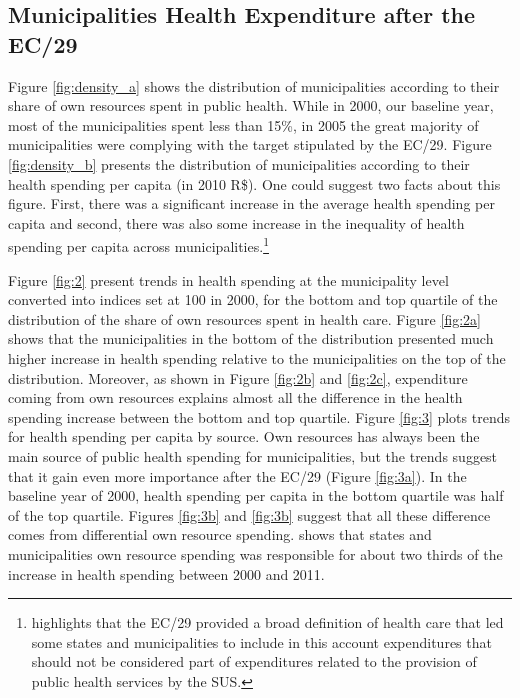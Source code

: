 

\subsection{Municipalities Health Expenditure after the EC/29}

Figure \ref{fig:density_a} shows the distribution of municipalities according to their share of own resources spent in public health. While in 2000, our baseline year, most of the municipalities spent less than 15\%, in 2005 the great majority of municipalities were complying with the target stipulated by the EC/29. Figure \ref{fig:density_b} presents the distribution of municipalities according to their health spending per capita (in 2010 R\$). One could suggest two facts about this figure. First, there was a significant increase in the average health spending per capita and second, there was also some increase in the inequality of health spending per capita across municipalities.\footnote{\cite{Piola2013} highlights that the EC/29 provided a broad definition of health care that led some states and municipalities to include in this account expenditures that should not be considered part of expenditures related to the provision of public health services by the SUS.}


Figure \ref{fig:2} present trends in health spending at the municipality level converted into indices set at 100 in 2000, for the bottom and top quartile of the distribution of the share of own resources spent in health care. Figure \ref{fig:2a} shows that the municipalities in the bottom of the distribution presented much higher increase in health spending relative to the municipalities on the top of the distribution. Moreover, as shown in Figure \ref{fig:2b} and \ref{fig:2c}, expenditure coming from own resources explains almost all the difference in the health spending increase between the bottom and top quartile. Figure \ref{fig:3} plots trends for health spending per capita by source. Own resources has always been the main source of public health spending for municipalities, but the trends suggest that it gain even more importance after the EC/29 (Figure \ref{fig:3a}). In the baseline year of 2000, health spending per capita in the bottom quartile was half of the top quartile. Figures \ref{fig:3b} and \ref{fig:3b} suggest that all these difference comes from differential own resource spending. \cite{Piola2013} shows that states and municipalities own resource spending was responsible for about two thirds of the increase in health spending between 2000 and 2011.

